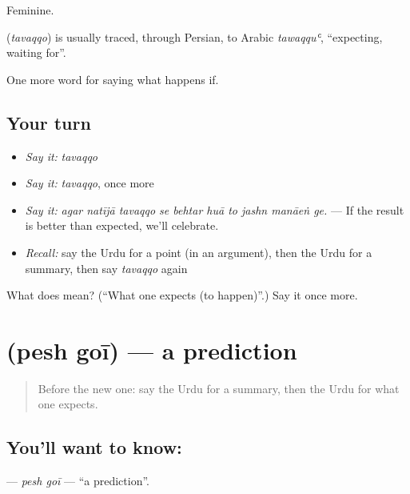 Feminine.

\begin{cousinweb}
\textbf{} (\emph{tavaqqo}) is usually traced, through Persian, to Arabic \emph{tawaqquʿ}, \textquotedblleft{}expecting, waiting for\textquotedblright{}.
\end{cousinweb}

\begin{grammarlens}[title={What you've built}]
One more word for saying what happens if.
\end{grammarlens}

\subsection*{Your turn}
\begin{itemize}
\raggedright
  \item \emph{Say it:} \emph{tavaqqo}
  \item \emph{Say it:} \emph{tavaqqo}, once more
  \item \emph{Say it:} \emph{agar natījā tavaqqo se behtar huā to jashn manāeṅ ge.} — If the result is better than expected, we'll celebrate.
  \item \emph{Recall:} say the Urdu for a point (in an argument), then the Urdu for a summary, then say \emph{tavaqqo} again
\end{itemize}

\begin{tcolorbox}[breakable,colback=teal!4,colframe=teal!35!black,title={Before you move on}]
What does  mean? (\textquotedblleft{}What one expects (to happen)\textquotedblright{}.) Say it once more.
\end{tcolorbox}
\section[\texorpdfstring{\ur{پیش} \ur{گوئی} (pesh goī)}{پیش گوئی (pesh goī)}]{  (pesh goī) — a prediction}

\label{lesson:UR-C543-pesh-goi}



\begin{quote}
Before the new one: say the Urdu for a summary, then the Urdu for what one expects.
\end{quote}

\subsection*{You'll want to know:  }
\textbf{ } — \emph{pesh goī} — \textquotedblleft{}a prediction\textquotedblright{}.

